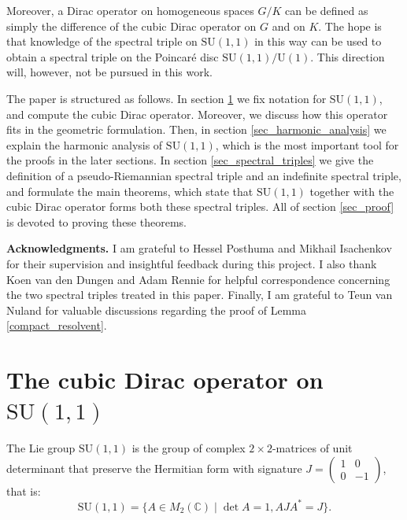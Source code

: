 \documentclass{amsart}
\theoremstyle{definition}
\theoremstyle{remark}
\numberwithin{equation}{section}
\begin{document}
Moreover, a Dirac operator on homogeneous spaces $G/K$ can be defined as simply the difference of the cubic Dirac operator on $G$ and on $K$. The hope is that knowledge of the spectral triple on $\mathrm{SU}(1,1)$ in this way can be used to obtain a spectral triple on the Poincaré disc $\mathrm{SU}(1,1)/\mathrm{U}(1)$. This direction will, however, not be pursued in this work.

The paper is structured as follows. In section \ref{sec_cubic_dirac} we fix notation for $\mathrm{SU}(1,1)$, and compute the cubic Dirac operator. Moreover, we discuss how this operator fits in the geometric formulation. Then, in section \ref{sec_harmonic_analysis} we explain the harmonic analysis of $\mathrm{SU}(1,1)$, which is the most important tool for the proofs in the later sections. In section \ref{sec_spectral_triples} we give the definition of a pseudo-Riemannian spectral triple and an indefinite spectral triple, and formulate the main theorems, which state that $\mathrm{SU}(1,1)$ together with the cubic Dirac operator forms both these spectral triples. All of section \ref{sec_proof} is devoted to proving these theorems.

\textbf{Acknowledgments.} I am grateful to Hessel Posthuma and Mikhail Isachenkov for their supervision and insightful feedback during this project. I also thank Koen van den Dungen and Adam Rennie for helpful correspondence concerning the two spectral triples treated in this paper. Finally, I am grateful to Teun van Nuland for valuable discussions regarding the proof of Lemma \ref{compact_resolvent}.

\section{The cubic Dirac operator on $\mathrm{SU}(1,1)$}\label{sec_cubic_dirac}
The Lie group $\mathrm{SU}(1,1)$ is the group of complex $2\times 2$-matrices of unit determinant that preserve the Hermitian form with signature $J=\begin{pmatrix} 1 & 0 \\ 0 & -1 \end{pmatrix}$, that is:
\begin{equation*}
    \mathrm{SU}(1,1)=\{ A\in M_2(\mathbb{C})\mid\det{A}=1, AJA^*=J\}.
\end{equation*}
\end{document}
